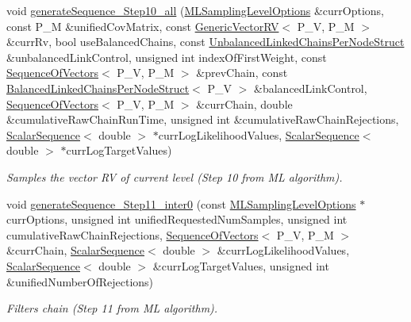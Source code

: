 \begin{DoxyCompactItemize}
void \hyperlink{class_q_u_e_s_o_1_1_m_l_sampling_a04322fda4c97eee6c6739fc007d642c1}{generate\-Sequence\-\_\-\-Step10\-\_\-all} (\hyperlink{class_q_u_e_s_o_1_1_m_l_sampling_level_options}{M\-L\-Sampling\-Level\-Options} \&curr\-Options, const P\-\_\-\-M \&unified\-Cov\-Matrix, const \hyperlink{class_q_u_e_s_o_1_1_generic_vector_r_v}{Generic\-Vector\-R\-V}$<$ P\-\_\-\-V, P\-\_\-\-M $>$ \&curr\-Rv, bool use\-Balanced\-Chains, const \hyperlink{struct_q_u_e_s_o_1_1_unbalanced_linked_chains_per_node_struct}{Unbalanced\-Linked\-Chains\-Per\-Node\-Struct} \&unbalanced\-Link\-Control, unsigned int index\-Of\-First\-Weight, const \hyperlink{class_q_u_e_s_o_1_1_sequence_of_vectors}{Sequence\-Of\-Vectors}$<$ P\-\_\-\-V, P\-\_\-\-M $>$ \&prev\-Chain, const \hyperlink{struct_q_u_e_s_o_1_1_balanced_linked_chains_per_node_struct}{Balanced\-Linked\-Chains\-Per\-Node\-Struct}$<$ P\-\_\-\-V $>$ \&balanced\-Link\-Control, \hyperlink{class_q_u_e_s_o_1_1_sequence_of_vectors}{Sequence\-Of\-Vectors}$<$ P\-\_\-\-V, P\-\_\-\-M $>$ \&curr\-Chain, double \&cumulative\-Raw\-Chain\-Run\-Time, unsigned int \&cumulative\-Raw\-Chain\-Rejections, \hyperlink{class_q_u_e_s_o_1_1_scalar_sequence}{Scalar\-Sequence}$<$ double $>$ $\ast$curr\-Log\-Likelihood\-Values, \hyperlink{class_q_u_e_s_o_1_1_scalar_sequence}{Scalar\-Sequence}$<$ double $>$ $\ast$curr\-Log\-Target\-Values)
\begin{DoxyCompactList}\small\item\em Samples the vector R\-V of current level (Step 10 from M\-L algorithm). \end{DoxyCompactList}\item 
void \hyperlink{class_q_u_e_s_o_1_1_m_l_sampling_aae527304bc1012a91ffc396e94fbab11}{generate\-Sequence\-\_\-\-Step11\-\_\-inter0} (const \hyperlink{class_q_u_e_s_o_1_1_m_l_sampling_level_options}{M\-L\-Sampling\-Level\-Options} $\ast$curr\-Options, unsigned int unified\-Requested\-Num\-Samples, unsigned int cumulative\-Raw\-Chain\-Rejections, \hyperlink{class_q_u_e_s_o_1_1_sequence_of_vectors}{Sequence\-Of\-Vectors}$<$ P\-\_\-\-V, P\-\_\-\-M $>$ \&curr\-Chain, \hyperlink{class_q_u_e_s_o_1_1_scalar_sequence}{Scalar\-Sequence}$<$ double $>$ \&curr\-Log\-Likelihood\-Values, \hyperlink{class_q_u_e_s_o_1_1_scalar_sequence}{Scalar\-Sequence}$<$ double $>$ \&curr\-Log\-Target\-Values, unsigned int \&unified\-Number\-Of\-Rejections)
\begin{DoxyCompactList}\small\item\em Filters chain (Step 11 from M\-L algorithm). \end{DoxyCompactList}\item 

\end{DoxyCompactItemize}
